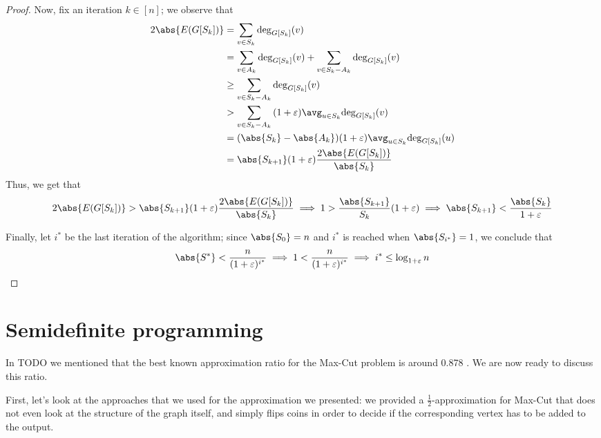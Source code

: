 \documentclass[a4paper, 12pt]{report}
\begin{document}
\begin{proof}
        Now, fix an iteration $k \in [n]$; we observe that
        \begin{equation*}
            \begin{split}
                2 \abs{E(G[S_k])} &= \sum_{v \in S_k}{\deg_{G[S_k]}(v)} \\
                                  &= \sum_{v \in A_k}{\deg_{G[S_k]}(v)} + \sum_{v \in S_k - A_k}{\deg_{G[S_k]}(v)} \\
                                  &\ge \sum_{v \in S_k - A_k}{\deg_{G[S_k]}(v)} \\
                                  &> \sum_{v \in S_k - A_k}{(1 + \varepsilon) \avg_{ u \in S_k}{\deg_{G[S_k]}(v)}} \\
                                  &= (\abs {S_k} - \abs{A_k})(1 + \varepsilon) \avg_{u \in S_k}{\deg_{G[S_k]}(u)} \\
                                  &= \abs{S_{k + 1}}(1 + \varepsilon) \dfrac{2 \abs{E(G[S_k])}}{\abs{S_k}}
            \end{split}
        \end{equation*}
        Thus, we get that $$2 \abs{E(G[S_k])} > \abs{S_{k + 1}} (1 + \varepsilon)\dfrac{2 \abs{E(G[S_k])}}{\abs{S_k}} \implies 1 > \dfrac{\abs{S_{k + 1}}}{S_k}(1 + \varepsilon) \implies \abs{S_{k + 1}} < \dfrac{\abs{S_k}}{1 + \varepsilon}$$

        Finally, let $i^*$ be the last iteration of the algorithm; since $\abs{S_0} = n$ and $i^*$ is reached when $\abs{S_{i^*}} = 1$, we conclude that $$\abs{S^*} < \dfrac{n}{(1 + \varepsilon)^{i^*}} \implies 1 < \dfrac{n}{(1 + \varepsilon)^{i^*}} \implies i^* \le \log_{1 + \varepsilon}{n}$$
    \end{proof}

    \section{Semidefinite programming}

    In TODO  we mentioned that the best known approximation ratio for the Max-Cut problem is around 0.878 . We are now ready to discuss this ratio.

    First, let's look at the approaches that we used for the approximation we presented: we provided a $\tfrac{1}{2}$-approximation for Max-Cut that does not even look at the structure of the graph itself, and simply flips coins in order to decide if the corresponding vertex has to be added to the output.
\end{document}
